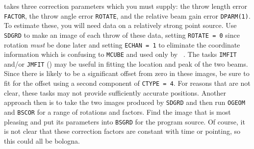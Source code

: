      {\tt {}} takes three correction parameters which you
must supply: the throw length error {\tt FACTOR}, the throw angle
error {\tt ROTATE}, and the relative beam gain error {\tt DPARM(1)}.
To estimate these, you will need data on a relatively strong point
source.  Use {\tt SDGRD} to make an image of each throw of these data,
setting {\tt ROTATE = 0} since rotation {\it must\/} be done later and
setting {\tt ECHAN = 1} to eliminate the coordinate information which
is confusing to {\tt MCUBE} and used only by \hbox{{\tt
{}}}.  The tasks {\tt IMFIT} and/or {\tt JMFIT}
() may be useful in fitting the location and peak of the
two beams.  Since there is likely to be a significant offset from zero
in these images, be sure to fit for the offset using a second
component of {\tt CTYPE = 4}.  For reasons that are not clear, these
tasks may not provide sufficiently accurate positions.  Another
approach then is to take the two images produced by {\tt SDGRD} and
then run {\tt OGEOM} and {\tt BSCOR} for a range of rotations and
factors.  Find the image that is most pleasing and put its parameters
into {\tt BSGRD} for the program source.  Of course, it is not clear
that these correction factors are constant with time or pointing, so
this could all be bologna.

